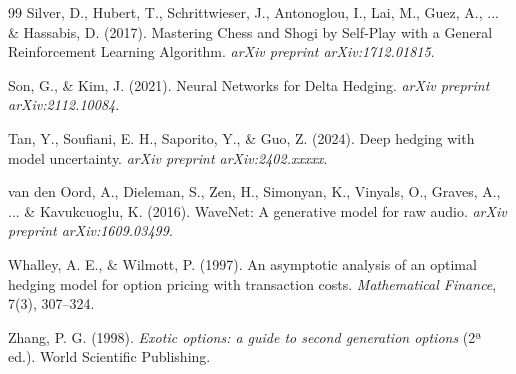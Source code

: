 \documentclass[11pt,a4paper,spanish]{article}
\numberwithin{equation}{section} %
\begin{document}
\begin{thebibliography}{99}
 Silver, D., Hubert, T., Schrittwieser, J., Antonoglou, I., Lai, M., Guez, A., ... \& Hassabis, D. (2017). Mastering Chess and Shogi by Self-Play with a General Reinforcement Learning Algorithm. \textit{arXiv preprint arXiv:1712.01815}.

 Son, G., \& Kim, J. (2021). Neural Networks for Delta Hedging. \textit{arXiv preprint arXiv:2112.10084}.

 Tan, Y., Soufiani, E. H., Saporito, Y., \& Guo, Z. (2024). Deep hedging with model uncertainty. \textit{arXiv preprint arXiv:2402.xxxxx}.

 van den Oord, A., Dieleman, S., Zen, H., Simonyan, K., Vinyals, O., Graves, A., ... \& Kavukcuoglu, K. (2016). WaveNet: A generative model for raw audio. \textit{arXiv preprint arXiv:1609.03499}.

 Whalley, A. E., \& Wilmott, P. (1997). An asymptotic analysis of an optimal hedging model for option pricing with transaction costs. \textit{Mathematical Finance}, 7(3), 307--324.

 Zhang, P. G. (1998). \textit{Exotic options: a guide to second generation options} (2ª ed.). World Scientific Publishing.

\end{thebibliography}
\end{document}
